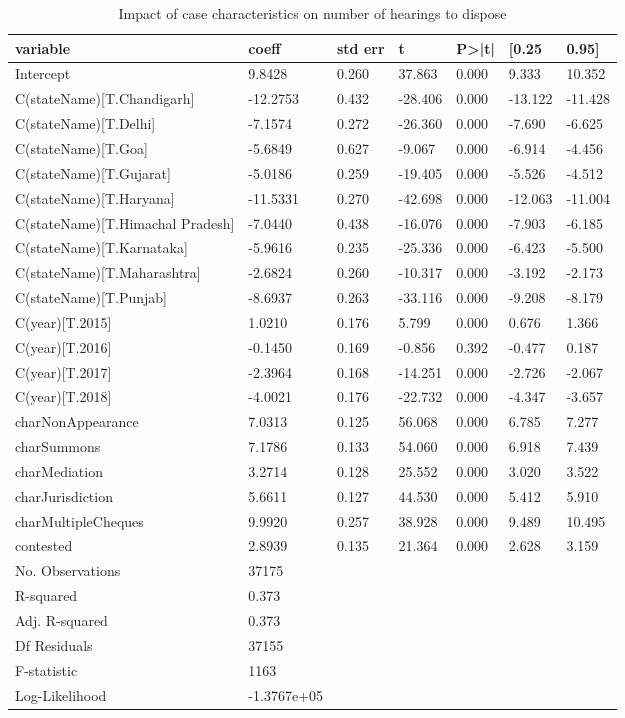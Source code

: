 \begin{longtable}{@{}lllllll@{}}
\caption{Impact of case characteristics on number of hearings to dispose}
\label{tab:hearings_reg}\\
\toprule
variable & coeff & std err & t & P>|t| & [0.25 & 0.95] \\\midrule
\endhead
%
Intercept & 9.8428 & 0.260 & 37.863 & 0.000 & 9.333 & 10.352 \\
C(stateName)[T.Chandigarh] & -12.2753 & 0.432 & -28.406 & 0.000 & -13.122 & -11.428 \\
C(stateName)[T.Delhi] & -7.1574 & 0.272 & -26.360 & 0.000 & -7.690 & -6.625 \\
C(stateName)[T.Goa] & -5.6849 & 0.627 & -9.067 & 0.000 & -6.914 & -4.456 \\
C(stateName)[T.Gujarat] & -5.0186 & 0.259 & -19.405 & 0.000 & -5.526 & -4.512 \\
C(stateName)[T.Haryana] & -11.5331 & 0.270 & -42.698 & 0.000 & -12.063 & -11.004 \\
C(stateName)[T.Himachal Pradesh] & -7.0440 & 0.438 & -16.076 & 0.000 & -7.903 & -6.185 \\
C(stateName)[T.Karnataka] & -5.9616 & 0.235 & -25.336 & 0.000 & -6.423 & -5.500 \\
C(stateName)[T.Maharashtra] & -2.6824 & 0.260 & -10.317 & 0.000 & -3.192 & -2.173 \\
C(stateName)[T.Punjab] & -8.6937 & 0.263 & -33.116 & 0.000 & -9.208 & -8.179 \\
C(year)[T.2015] & 1.0210 & 0.176 & 5.799 & 0.000 & 0.676 & 1.366 \\
C(year)[T.2016] & -0.1450 & 0.169 & -0.856 & 0.392 & -0.477 & 0.187 \\
C(year)[T.2017] & -2.3964 & 0.168 & -14.251 & 0.000 & -2.726 & -2.067 \\
C(year)[T.2018] & -4.0021 & 0.176 & -22.732 & 0.000 & -4.347 & -3.657 \\
charNonAppearance & 7.0313 & 0.125 & 56.068 & 0.000 & 6.785 & 7.277 \\
charSummons & 7.1786 & 0.133 & 54.060 & 0.000 & 6.918 & 7.439 \\
charMediation & 3.2714 & 0.128 & 25.552 & 0.000 & 3.020 & 3.522 \\
charJurisdiction & 5.6611 & 0.127 & 44.530 & 0.000 & 5.412 & 5.910 \\
charMultipleCheques & 9.9920 & 0.257 & 38.928 & 0.000 & 9.489 & 10.495 \\
contested & 2.8939 & 0.135 & 21.364 & 0.000 & 2.628 & 3.159\\
\bottomrule
No. Observations & 37175 & & & & &\\
R-squared & 0.373 & & & & & \\
Adj. R-squared& 0.373& & & & & \\
Df Residuals& 37155 & & & & &\\
F-statistic & 1163 & & & & & \\
Log-Likelihood & -1.3767e+05 & & & & & \\
\bottomrule
\end{longtable}

